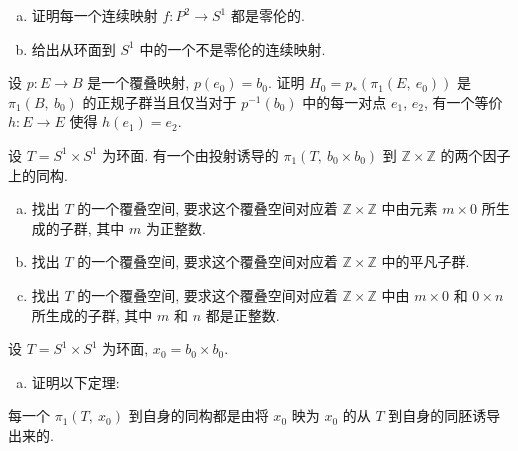\begin{exercise}
\label{exercise:ch13-sec79-02}
\begin{enumerate}[(a)]
\item 证明每一个连续映射 $f\colon P^{2}\to S^{1}$ 都是零伦的.
\item 给出从环面到 $S^{1}$ 中的一个不是零伦的连续映射.
\end{enumerate}
\end{exercise}

\begin{exercise}
\label{exercise:ch13-sec79-03}
设 $p\colon E\to B$ 是一个覆叠映射, $p(e_{0})=b_{0}$. 证明 $H_{0}=p_{*}(\pi_{1}(E,\ e_{0}))$ 是 $\pi_{1}(B,\ b_{0})$ 的正规子群当且仅当对于 $p^{-1}(b_{0})$ 中的每一对点 $e_{1}$, $e_{2}$, 有一个等价 $h\colon E\to E$ 使得 $h(e_{1})=e_{2}$.
\end{exercise}

\begin{exercise}
\label{exercise:ch13-sec79-04}
设 $T=S^{1}\times S^{1}$ 为环面. 有一个由投射诱导的 $\pi_{1}(T,\ b_{0}\times b_{0})$ 到 $\mathbb{Z}\times\mathbb{Z}$ 的两个因子上的同构.
\begin{enumerate}[(a)]
\item 找出 $T$ 的一个覆叠空间, 要求这个覆叠空间对应着 $\mathbb{Z}\times\mathbb{Z}$ 中由元素 $m\times 0$ 所生成的子群, 其中 $m$ 为正整数.
\item 找出 $T$ 的一个覆叠空间, 要求这个覆叠空间对应着 $\mathbb{Z}\times\mathbb{Z}$ 中的平凡子群.
\item 找出 $T$ 的一个覆叠空间, 要求这个覆叠空间对应着 $\mathbb{Z}\times\mathbb{Z}$ 中由 $m\times 0$ 和 $0\times n$ 所生成的子群, 其中 $m$ 和 $n$ 都是正整数.
\end{enumerate}
\end{exercise}

\begin{exercise}
\label{exercise:ch13-sec79-05}
设 $T=S^{1}\times S^{1}$ 为环面, $x_{0}=b_{0}\times b_{0}$.
\begin{enumerate}[(a)]
\item 证明以下定理:
\end{enumerate}

\begin{theorem}[环面的自同构]
\label{theorem:ch13-torus-automorphism}
每一个 $\pi_{1}(T,\ x_{0})$ 到自身的同构都是由将 $x_{0}$ 映为 $x_{0}$ 的从 $T$ 到自身的同胚诱导出来的.
\end{theorem}
\end{exercise}

